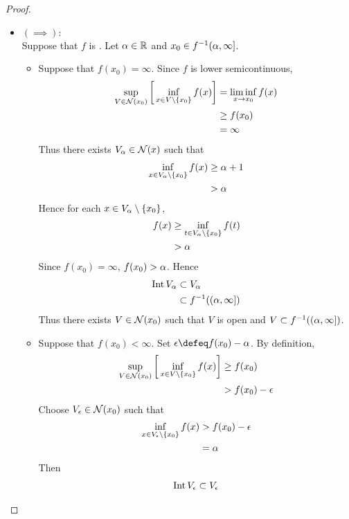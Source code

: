 \documentclass{book}
\begin{document}
	\begin{proof}\
	\begin{itemize}
		\item $(\implies):$ \\
		Suppose that $f$ is \lsc. Let $\alpha \in \mathbb{R}$ and $x_0 \in f^{-1}(\alpha, \infty]$. 
		\begin{itemize}
			\item Suppose that $f(x_0) = \infty$. Since $f$ is lower semicontinuous, 
			\begin{align*}
				\sup_{V \in \mathcal{N}(x_0)} \bigg[ \inf_{x \in V\setminus \{x_0\} } f(x) \bigg] 
				& = \liminf_{x \rightarrow x_0} f(x) \\
				& \geq f(x_0) \\
				& = \infty
			\end{align*}
			Thus there exists $V_{\alpha} \in \mathcal{N}(x)$ such that 
			\begin{align*}
				\inf\limits_{x \in V_{\alpha} \setminus \{x_0\} } f(x) 
				& \geq \alpha + 1 \\
				& > \alpha 
			\end{align*}
			Hence for each $x \in V_{\alpha} \setminus \{x_0\}$,
			\begin{align*}
				f(x)
				& \geq \inf\limits_{t \in V_{\alpha} \setminus \{x_0\} } f(t) \\
				& > \alpha 
			\end{align*}
			Since $f(x_0) = \infty$, $f(x_0) > \alpha$. Hence  
			\begin{align*}
				\operatorname{Int} V_{\alpha} 
				& \subset V_{\alpha} \\
				& \subset f^{-1}((\alpha, \infty])
			\end{align*} 
			Thus there exists $V \in \mathcal{N}(x_0)$ such that $V$ is open and $V \subset f^{-1}((\alpha, \infty])$.
			\item Suppose that $f(x_0) < \infty$. Set $\ep \defeq f(x_0) - \al$. By definition,  
			\begin{align*}
				\sup_{V \in \mathcal{N}(x_0)} \bigg[ \inf_{x \in V \setminus \{x_0\}} f(x)  \bigg]
				& \geq f(x_0) \\
				& > f(x_0) - \epsilon 
			\end{align*}
			Choose $V_{\epsilon} \in \mathcal{N}(x_0)$ such that 
			\begin{align*}
				\inf_{x \in V_{\epsilon} \setminus \{x_0\}} f(x)  
				&> f(x_0) - \epsilon \\
				&= \alpha
			\end{align*}
			Then
			\begin{align*}
				\Int V_{\ep} 
				& \subset V_{\ep} \\

\end{align*}
\end{itemize}
\end{itemize}
\end{proof}
\end{document}
